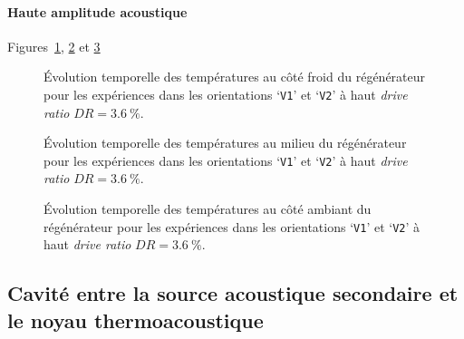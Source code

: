 \paragraph{Haute amplitude acoustique} Figures~\ref{fig:Acou_CHXin_V1V2_High}, \ref{fig:Acou_Regmid_V1V2_High} et \ref{fig:Acou_AHXin_V1V2_High}
\begin{figure}[!ht] %
    \centering
    
    \caption{\'Evolution temporelle des températures au côté froid du régénérateur pour les expériences dans les orientations `\texttt{V1}' et `\texttt{V2}' à haut \textit{drive ratio} $DR=\qty{3.6}{\percent}$.}
    \label{fig:Acou_CHXin_V1V2_High}
\end{figure}

\begin{figure}[!ht] %
    \centering
    
    \caption{\'Evolution temporelle des températures au milieu du régénérateur pour les expériences dans les orientations `\texttt{V1}' et `\texttt{V2}' à haut \textit{drive ratio} $DR=\qty{3.6}{\percent}$.}
    \label{fig:Acou_Regmid_V1V2_High}
\end{figure}

\begin{figure}[!ht] %
    \centering
    
    \caption{\'Evolution temporelle des températures au côté ambiant du régénérateur pour les expériences dans les orientations `\texttt{V1}' et `\texttt{V2}' à haut \textit{drive ratio} $DR=\qty{3.6}{\percent}$.}
    \label{fig:Acou_AHXin_V1V2_High}
\end{figure}





\subsection{Cavité entre la source acoustique secondaire et le noyau thermoacoustique}

%    
%
%    

